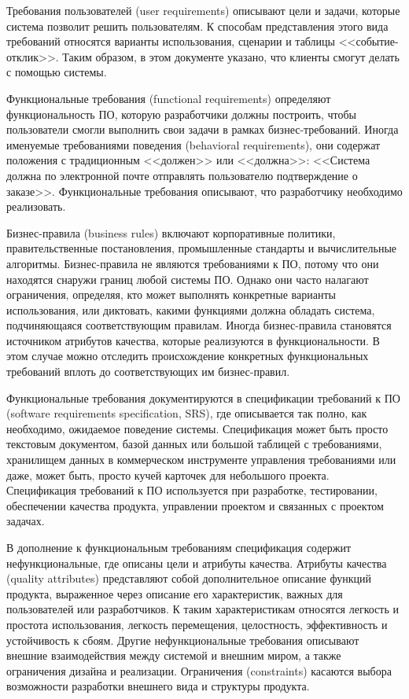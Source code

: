 \documentclass{../../text-style}
\begin{document}
Требования пользователей (user requirements) описывают цели и задачи, которые система позволит решить пользователям. К способам представления этого вида требований относятся варианты использования, сценарии и таблицы <<событие-отклик>>. Таким образом, в этом документе указано, что клиенты смогут делать с помощью системы.

Функциональные требования (functional requirements) определяют функциональность ПО, которую разработчики должны построить, чтобы пользователи смогли выполнить свои задачи в рамках бизнес-требований. Иногда именуемые требованиями поведения (behavioral requirements), они содержат положения с традиционным <<должен>> или <<должна>>: <<Система должна по электронной почте отправлять пользователю подтверждение о заказе>>. Функциональные требования описывают, что разработчику необходимо реализовать.

Бизнес-правила (business rules) включают корпоративные политики, правительственные постановления, промышленные стандарты и вычислительные алгоритмы. Бизнес-правила не являются требованиями к ПО, потому что они находятся снаружи границ любой системы ПО. Однако они часто налагают ограничения, определяя, кто может выполнять конкретные варианты использования, или диктовать, какими функциями должна обладать система, подчиняющаяся соответствующим правилам. Иногда бизнес-правила становятся источником атрибутов качества, которые реализуются в функциональности. В этом случае можно отследить происхождение конкретных функциональных требований вплоть до соответствующих им бизнес-правил.

Функциональные требования документируются в спецификации требований к ПО (software requirements specification, SRS), где описывается так полно, как необходимо, ожидаемое поведение системы. Спецификация может быть просто текстовым документом, базой данных или большой таблицей с требованиями, хранилищем данных в коммерческом инструменте управления требованиями или даже, может быть, просто кучей карточек для небольшого проекта. Спецификация требований к ПО используется при разработке, тестировании, обеспечении качества продукта, управлении проектом и связанных с проектом задачах.

В дополнение к функциональным требованиям спецификация содержит нефункциональные, где описаны цели и атрибуты качества. Атрибуты качества (quality attributes) представляют собой дополнительное описание функций продукта, выраженное через описание его характеристик, важных для пользователей или разработчиков. К таким характеристикам относятся легкость и простота использования, легкость перемещения, целостность, эффективность и устойчивость к сбоям. Другие нефункциональные требования описывают внешние взаимодействия между системой и внешним миром, а также ограничения дизайна и реализации. Ограничения (constraints) касаются выбора возможности разработки внешнего вида и структуры продукта.
\end{document}
